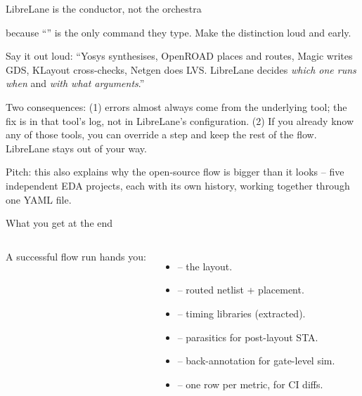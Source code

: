 \begin{frame}{LibreLane is the conductor, not the orchestra}
{    because ``'' is the only command they
    type. Make the distinction loud and early.\par
    Say it out loud: ``Yosys synthesises, OpenROAD places and routes,
    Magic writes GDS, KLayout cross-checks, Netgen does LVS. LibreLane
    decides \emph{which one runs when} and \emph{with what arguments}.''\par
    Two consequences: (1) errors almost always come from the underlying
    tool; the fix is in that tool's log, not in LibreLane's
    configuration. (2) If you already know any of those tools, you can
    override a step and keep the rest of the flow. LibreLane stays out
    of your way.\par
    Pitch: this also explains why the open-source flow is bigger than it
    looks -- five independent EDA projects, each with its own history,
    working together through one YAML file.}
\end{frame}

\begin{frame}{What you get at the end}
  \begin{columns}[T,onlytextwidth]
      A successful flow run hands you:
      \begin{itemize}\small
        \item {} -- the layout.
        \item {} -- routed netlist + placement.
        \item {} -- timing libraries (extracted).
        \item {} -- parasitics for post-layout STA.
        \item {} -- back-annotation for gate-level sim.
        \item {} -- one row per metric, for CI diffs.
      \end{itemize}
  \end{columns}
\end{frame}

